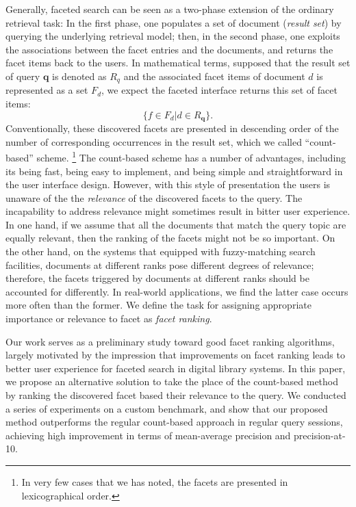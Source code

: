 Generally, faceted search can be seen as a two-phase extension of the ordinary
retrieval task: In the first phase, one populates a set of document
(\emph{result set}) by querying the underlying retrieval model; then, in the
second phase, one exploits the associations between the facet entries and the
documents, and returns the facet items back to the users.  In mathematical
terms, supposed that the result set of query $\mathbf{q}$ is denoted as $R_{q}$
and the associated facet items of document $d$ is represented as a set $F_d$,
we expect the faceted interface returns this set of facet items: \[ \{ f \in
F_d | d \in R_{\mathbf{q}} \}.  \] Conventionally, these discovered facets are
presented in descending order of the number of corresponding occurrences in the
result set, which we called ``count-based'' scheme.  \footnote{In very few
cases that we has noted, the facets are presented in lexicographical order.}
The count-based scheme has a number of advantages, including its being fast,
being easy to implement, and being simple and straightforward in the user
interface design.  However, with this style of presentation the users is
unaware of the the \emph{relevance} of the discovered facets to the query.  The
incapability to address relevance might sometimes result in bitter user
experience.  In one hand, if we assume that all the documents that match the
query topic are equally relevant, then the ranking of the facets might not be
so important.  On the other hand, on the systems that equipped with
fuzzy-matching search facilities, documents at different ranks pose different
degrees of relevance; therefore, the facets triggered by documents at different
ranks should be accounted for differently.  In real-world applications, we find
the latter case occurs more often than the former.  We define the task for
assigning appropriate importance or relevance to facet as \emph{facet ranking}.

Our work serves as a preliminary study toward good facet ranking algorithms,
largely motivated by the impression that improvements on facet ranking leads to
better user experience for faceted search in digital library systems.  In this
paper, we propose an alternative solution to take the place of the count-based
method by ranking the discovered facet based their relevance to the query.  We
conducted a series of experiments on a custom benchmark, and show that our
proposed method outperforms the regular count-based approach in regular query
sessions, achieving high improvement in terms of mean-average precision and
precision-at-10.

